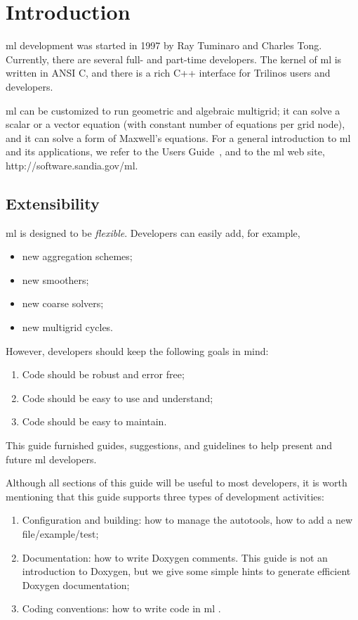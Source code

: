 \documentclass[10pt,letter,relax]{SANDreport}
\newcommand{\ML}     {{\sc ml }}
\begin{document}
\clearpage
\newpage


\section{Introduction}

\ML development was started in 1997 by Ray Tuminaro and Charles Tong.
Currently, there are several full- and part-time developers.
The kernel of \ML is written in ANSI C, and there is a rich C++ interface
for Trilinos users and developers. 

\ML can be customized to run geometric and algebraic multigrid; it can
solve a scalar or a vector equation (with constant number of equations
per grid node), and it can solve a form of Maxwell's equations.
For a general
introduction to \ML and its applications, we refer to the Users
Guide~\cite{ml_users_guide}, and to the \ML web site,
http://software.sandia.gov/ml. 

\subsection{Extensibility}
\label{extensibility}
%
\ML is designed to be {\sl flexible}. Developers can easily add, for example,
\begin{itemize}
\item new aggregation schemes;
\item new smoothers;
\item new coarse solvers;
\item new multigrid cycles.
\end{itemize}
However, developers should keep the following goals in mind:
\begin{enumerate}
\item Code should be robust and error free;
\item Code should be easy to use and understand;
\item Code should be easy to maintain.
\end{enumerate}
This guide furnished guides, suggestions, and guidelines to help present and
future \ML developers. 

Although all sections of this guide will be useful to most developers,
it is worth mentioning that this guide supports three types of
development activities:
\begin{enumerate}
\item Configuration and building: how to manage the autotools, how to
  add a new file/example/test;
\item Documentation: how to write Doxygen comments. This guide is not an
  introduction to Doxygen, but we give some simple hints to generate
  efficient Doxygen documentation;
\item Coding conventions: how to write code in \ML.
\end{enumerate}
\end{document}

